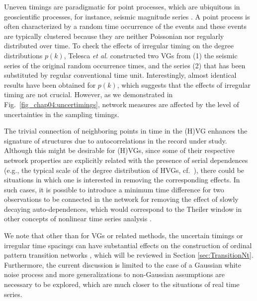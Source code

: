		Uneven timings are paradigmatic for point processes, which are ubiquitous in geoscientific processes, for instance, seismic magnitude series \cite{Telesca2012}. A point process is often characterized by a random time occurrence of the events and these events are typically clustered because they are neither Poissonian nor regularly distributed over time. To check the effects of irregular timing on the degree distributions $p(k)$, Telesca {\textit{et al.}} \cite{Telesca2012} constructed two VGs from (1) the seismic series of the original random occurrence times, and the series (2) that has been substituted by regular conventional time unit. Interestingly, almost identical results have been obtained for $p(k)$, which suggests that the effects of irregular timing are not crucial. However, as we demonstrated in Fig.~\ref{fig_chap04:uncertimings}, network measures are affected by the level of uncertainties in the sampling timings. 

		The trivial connection of neighboring points in time in the (H)VG enhances the signature of structures due to autocorrelations in the record under study. Although this might be desirable for (H)VGs, since some of their respective network properties are explicitly related with the presence of serial dependences (e.g., the typical scale of the degree distribution of HVGs, cf.\, \cite{Luque2009}), there could be situations in which one is interested in removing the corresponding effects. In such cases, it is possible to introduce a minimum time difference for two observations to be connected in the network for removing the effect of slowly decaying auto-dependences, which would correspond to the Theiler window in other concepts of nonlinear time series analysis \cite{Theiler1986}.
		
		We note that other than for VGs or related methods, the uncertain timings or irregular time spacings can have substantial effects on the construction of ordinal pattern transition networks \cite{Kulp2016a,McCullough2016,Sakellariou2016}, which will be reviewed in Section \ref{sec:TransitionNt}. Furthermore, the current discussion is limited to the case of a Gaussian white noise process and more generalizations to non-Gaussian assumptions are necessary to be explored, which are much closer to the situations of real time series. 


